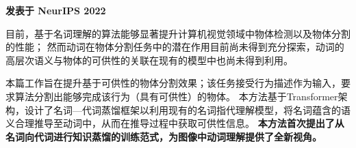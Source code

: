\documentclass{resume}
\begin{document}
\begin{spacing}{1.2}
  \textbf{发表于 NeurIPS 2022}
  
  \vspace{0.5em}
  目前，基于名词理解的算法能够显著提升计算机视觉领域中物体检测以及物体分割的性能；
  然而动词在物体分割任务中的潜在作用目前尚未得到充分探索，动词的高层次语义与物体的可供性的关联在现有的模型中也尚未得到利用。
  
  \vspace{0.5em}
  本篇工作旨在提升基于可供性的物体分割效果；该任务接受行为描述作为输入，要求算法分割出能够完成该行为（具有可供性）的物体。
  本方法基于Transformer架构，设计了名词—代词蒸馏框架以利用现有的名词指代理解模型，将名词蕴含的语义合理推导至动词中，从而在推导过程中获取可供性信息。
  \textbf{本方法首次提出了从名词向代词进行知识蒸馏的训练范式，为图像中动词理解提供了全新视角。}

\end{spacing}
\end{document}
